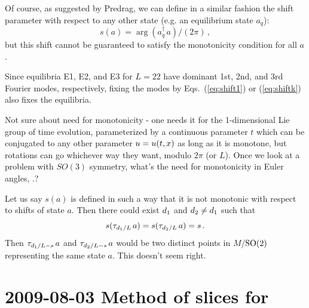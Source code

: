 Of course, as suggested by Predrag, we can define in a similar
fashion the shift parameter with respect to any other
state (e.g. an equilibrium state $a_q$):
\[ s(a) = \arg(a_q^\dagger\, a)/(2\pi)\,, \]
but this shift cannot be guaranteed to satisfy the
monotonicity condition for all $a$.

Since equilibria E1, E2, and E3 for $L = 22$ have dominant
1st, 2nd, and 3rd Fourier modes, respectively, fixing the modes by
Eqs.~(\ref{eq:shift1}) or (\ref{eq:shiftk}) also fixes the equilibria.


\medskip{}
\medskip{}
Not sure about need for monotonicity - one needs it for the 1-dimensional
Lie group of time evolution, parameterized by a continuous parameter $t$
which can be conjugated to any other parameter $u = u(t,\ssp)$ as long
as it is monotone, but rotations can go whichever way they want, modulo
$2\pi$ (or $L$). Once we look at a problem with $SO(3)$ symmetry, what's the
need for monotonicity in Euler angles, \etc.?

\medskip{}
Let us say $s(a)$ is defined in such a way that it is not monotonic with respect to
shifts of state $a$.  Then there could exist $d_1$ and $d_2 \neq d_1$ such that
\[ s(\tau_{d_1/L}\,a) = s(\tau_{d_2/L}\,a) = s\,. \]
Then $\tau_{d_1/L - s}\,a$ and $\tau_{d_2/L - s}\,a$ would be two distinct points
in $M$/$\textrm{SO}(2)$ representing the same state $a$.  This doesn't seem right.

\section{2009-08-03 Method of slices for \cLf}
\renewcommand{\ssp}{x}
\renewcommand{\vel}{\ensuremath{v}}   %

